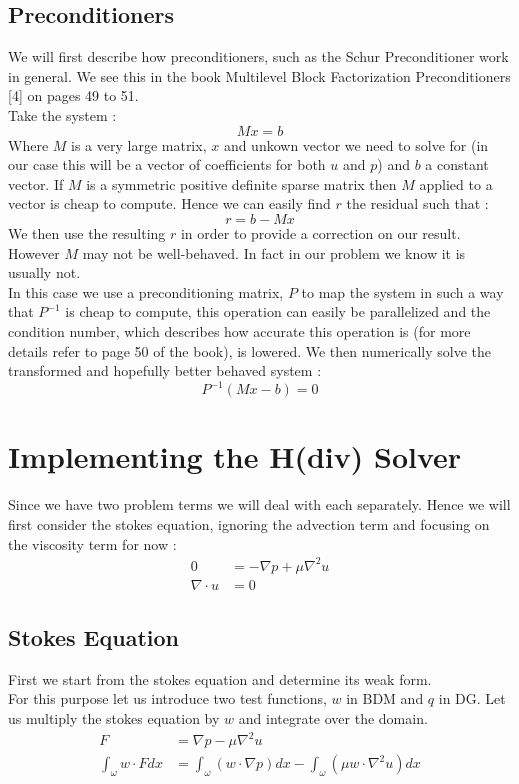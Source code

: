 \documentclass[11pt,twoside,a4paper]{article}
\begin{document}
\subsection{Preconditioners}

We will first describe how preconditioners, such as the Schur Preconditioner work in general. We see this in the book Multilevel Block Factorization Preconditioners [4] on pages 49 to 51.\\
Take the system :\\
$$
Mx = b
$$
Where $M$ is a very large matrix, $x$ and unkown vector we need to solve for (in our case this will be a vector of coefficients for both $u$ and $p$) and $b$ a constant vector. If $M$ is a symmetric positive definite sparse matrix then $M$ applied to a vector is cheap to compute. Hence we can easily find $r$ the residual such that :\\
$$
r = b - Mx
$$
We then use the resulting $r$ in order to provide a correction on our result.\\
However $M$ may not be well-behaved. In fact in our problem we know it is usually not.\\
In this case we use a preconditioning matrix, $P$ to map the system in such a way that $P^{-1}$ is cheap to compute, this operation can easily be parallelized and the condition number, which describes how accurate this operation is (for more details refer to page 50 of the book), is lowered.
We then numerically solve the transformed and hopefully better behaved system : 
$$
P^{-1}(Mx-b) = 0
$$ 
 


\section{Implementing the H(div) Solver}
Since we have two problem terms we will deal with each separately. Hence we will first consider the stokes equation, ignoring the advection term and focusing on the viscosity term for now :
\begin{align}
0 &= -\nabla p + \mu \nabla^2 u  \\
\nabla \cdot u &= 0
\end{align}

\subsection{Stokes Equation}
First we start from the stokes equation and determine its weak form.\\
For this purpose let us introduce two test functions, $w$ in BDM and $q$ in DG.
Let us multiply the stokes equation by $w$ and integrate over the domain.
\begin{align*}
F &= \nabla p - \mu \nabla^2 u \\
\int_\omega w \cdot F dx &= \int_\omega (w \cdot \nabla p) dx - \int_\omega (\mu w \cdot \nabla^2 u) dx
\end{align*}
\end{document}
